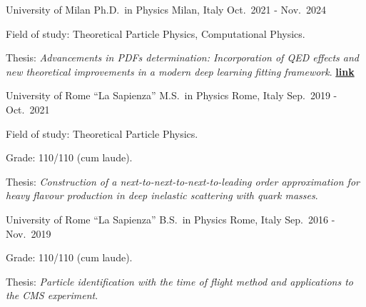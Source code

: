 

\begin{cventries}

    \cventry
        {University of Milan} %
        {Ph.D.\ in Physics} %
        {Milan, Italy} %
        {Oct.\ 2021 - Nov.\ 2024} %
        {
        \begin{cvitems} %
            \item Field of study: Theoretical Particle Physics, Computational Physics.
            \item Thesis: \emph{Advancements in PDFs determination: Incorporation of QED effects and new theoretical improvements in a modern deep learning fitting framework}. \href{https://hdl.handle.net/2434/1115085}{\textcolor{awesome-red}{{\textbf{link}}}}
        \end{cvitems}
        }

    \cventry
        {University of Rome ``La Sapienza''} %
        {M.S.\ in Physics} %
        {Rome, Italy} %
        {Sep.\ 2019 - Oct.\ 2021} %
        {
        \begin{cvitems} %
            \item Field of study: Theoretical Particle Physics.
            \item Grade: 110/110 (cum laude).
            \item Thesis: \emph{Construction of a next-to-next-to-next-to-leading order approximation for heavy flavour production in deep inelastic scattering with quark masses}. \href{https://inspirehep.net/literature/2750247}{\inspire}
        \end{cvitems}
        }

    \cventry
        {University of Rome ``La Sapienza''} %
        {B.S.\ in Physics} %
        {Rome, Italy} %
        {Sep.\ 2016 - Nov.\ 2019} %
        {
        \begin{cvitems} %
            \item Grade: 110/110 (cum laude).
            \item Thesis: \emph{Particle identification with the time of flight method and applications to the CMS experiment}.
        \end{cvitems}
        }

\end{cventries}